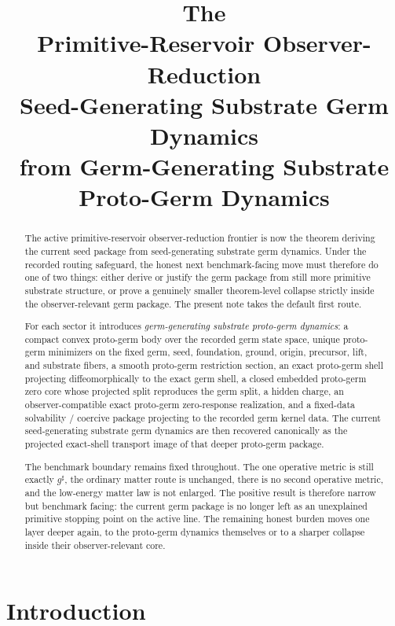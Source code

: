 \documentclass[11pt]{article}
\title{\textbf{The \TheoryName{}}\\[0.4em]
\large Primitive-Reservoir Observer-Reduction\\
\large Seed-Generating Substrate Germ Dynamics\\
\large from Germ-Generating Substrate Proto-Germ Dynamics}
\author{}
\date{}
\newcommand{\CompletedMetric}{g^{\sharp}}
\begin{document}
\maketitle

\begin{abstract}
The active primitive-reservoir observer-reduction frontier is now the theorem deriving the current seed package from seed-generating substrate germ dynamics. Under the recorded routing safeguard, the honest next benchmark-facing move must therefore do one of two things: either derive or justify the germ package from still more primitive substrate structure, or prove a genuinely smaller theorem-level collapse strictly inside the observer-relevant germ package. The present note takes the default first route.

For each sector it introduces \emph{germ-generating substrate proto-germ dynamics}: a compact convex proto-germ body over the recorded germ state space, unique proto-germ minimizers on the fixed germ, seed, foundation, ground, origin, precursor, lift, and substrate fibers, a smooth proto-germ restriction section, an exact proto-germ shell projecting diffeomorphically to the exact germ shell, a closed embedded proto-germ zero core whose projected split reproduces the germ split, a hidden charge, an observer-compatible exact proto-germ zero-response realization, and a fixed-data solvability / coercive package projecting to the recorded germ kernel data. The current seed-generating substrate germ dynamics are then recovered canonically as the projected exact-shell transport image of that deeper proto-germ package.

The benchmark boundary remains fixed throughout. The one operative metric is still exactly \(\CompletedMetric\), the ordinary matter route is unchanged, there is no second operative metric, and the low-energy matter law is not enlarged. The positive result is therefore narrow but benchmark facing: the current germ package is no longer left as an unexplained primitive stopping point on the active line. The remaining honest burden moves one layer deeper again, to the proto-germ dynamics themselves or to a sharper collapse inside their observer-relevant core.
\end{abstract}

\section{Introduction}
\end{document}
